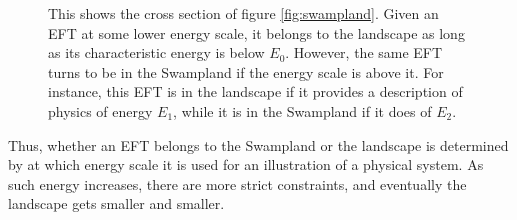 \begin{figure}
    \centering
    \caption{This shows the cross section of figure \ref{fig:swampland}. Given an EFT at some lower energy scale, it belongs to the landscape as long as its characteristic energy is below $E_{0}$. However, the same EFT turns to be in the Swampland if the energy scale is above it. For instance, this EFT is in the landscape if it provides a description of physics of energy $E_{1}$, while it is in the Swampland if it does of $E_{2}$.}
    \label{fig:cross}
\end{figure}
Thus, whether an EFT belongs to the Swampland or the landscape is determined by at which energy scale it is used for an illustration of a physical system. As such energy increases, there are more strict constraints, and eventually the landscape gets smaller and smaller.


